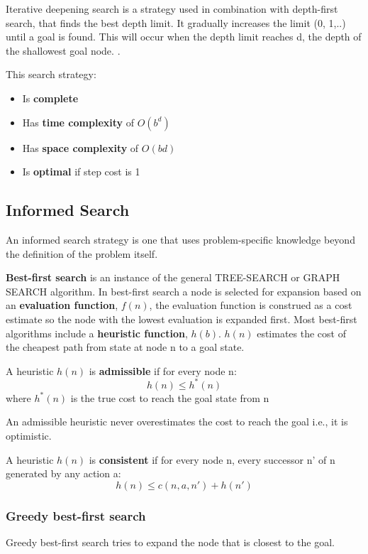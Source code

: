 \documentclass{article}
\begin{document}
Iterative deepening search is a strategy used in combination with depth-first search, that finds the best depth limit. It gradually increases the limit (0, 1,..) until a goal is found. This will occur when the depth limit reaches d, the depth of the shallowest goal node. . 

This search strategy:
\begin{itemize}
    \item Is \textbf{complete} 
    \item Has \textbf{time complexity} of $O(b^d)$ 
    \item Has \textbf{space complexity} of $O(bd)$
    \item Is \textbf{optimal} if step cost is 1
\end{itemize}

\subsection{Informed Search}

An informed search strategy is one that uses problem-specific knowledge beyond the definition of the problem itself.

\textbf{Best-first search} is an instance of the general TREE-SEARCH or GRAPH SEARCH algorithm. In best-first search a node is selected for expansion based on an \textbf{evaluation function}, $f(n)$, the evaluation function is construed as a cost estimate so the node with the lowest evaluation is expanded first. 
Most best-first algorithms include a \textbf{heuristic function}, $h(b)$. $h(n)$ estimates the cost of the cheapest path from state at node n to a goal state.  

A heuristic $h(n)$ is \textbf{admissible} if for every node n: $$h(n) \leq h^*(n)$$ where $h^*(n)$ is the true cost to reach the goal state from n 

An admissible heuristic never overestimates the cost to reach the goal i.e., it is optimistic. 

A heuristic $h(n)$ is \textbf{consistent} if for every node n, every successor n' of n generated by any action a: $$h(n) \leq c(n, a, n') + h(n')$$ 


\subsubsection{Greedy best-first search}

Greedy best-first search tries to expand the node that is closest to the goal.
\end{document}
